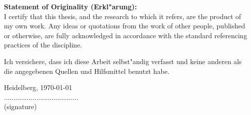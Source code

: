 \thispagestyle{empty}
\parindent0pt
\vspace*{1cm}

{\Large{\bf{Statement of Originality (Erkl"arung):}}}
\vspace{1cm}
\\
I certify that this thesis, and the research to which it refers, are the product of my own work. 
Any ideas or quotations from the work of other people, published or otherwise, 
are fully acknowledged in accordance with the standard referencing practices of the discipline. 

\vspace{2cm}
Ich versichere, dass ich diese Arbeit selbst"andig verfasst und keine anderen als die
angegebenen Quellen und Hilfsmittel benutzt habe.

\vspace{3cm}

Heidelberg, \today \\
\hspace*{10.0cm}.......................................\\
\hspace*{11.1cm}(signature)
